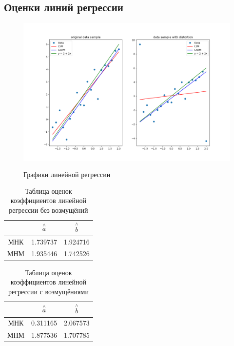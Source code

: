 \documentclass[a4]{article}
\begin{document}
\subsection{Оценки линий регрессии}
\begin{figure}[H]
	\centering
	\caption{Графики линейной регрессии}
	\includegraphics[scale = 0.6]{graph.png} 
	\label{fig:reg}
\end{figure}

\begin{table}[H]
	\caption{Таблица оценок коэффициентов линейной регрессии без возмущёний}
	\label{tab:my_label1}
	\begin{center}
		\vspace{5mm}
		\begin{tabular}{|c|c|c|}
			\hline
			& $\overset{\wedge}{a}$ & $\overset{\wedge}{b}$\\
			\hline
			МНК &1.739737&1.924716\\
			\hline
			МНМ &1.935446&1.742526\\
			\hline
		\end{tabular}
	\end{center}
\end{table}


\begin{table}[H]
	\caption{Таблица оценок коэффициентов линейной регрессии с возмущёниями}
	\label{tab:my_label2}
	\begin{center}
		\vspace{5mm}
		\begin{tabular}{|c|c|c|}
			\hline
			& $\overset{\wedge}{a}$ & $\overset{\wedge}{b}$\\
			\hline
			МНК &0.311165&2.067573\\
			\hline
			МНМ &1.877536 &1.707785\\
			\hline
		\end{tabular}
	\end{center}
\end{table}
\end{document}

